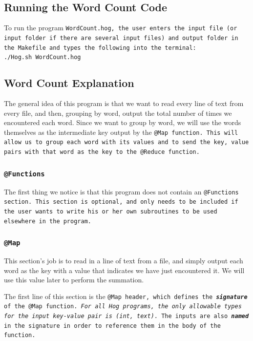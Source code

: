 \documentclass{report}
\begin{document}
\subsection{Running the Word Count Code} %
\label{sub:running_the_word_count_code}

To run the program \tt WordCount.hog\rm, the user enters the input file (or input folder if there are several input files) and output folder in the Makefile and types the following into the
terminal: \\

\noindent \tt ./Hog.sh WordCount.hog  \rm \\


\subsection{Word Count Explanation}

The general idea of this program is that we want to read every line of text from
every file, and then, grouping by word, output the total number of times we
encountered each word. Since we want to group by word, we will use the words
themselves as the intermediate key output by the \tt @Map \rm function. This will
allow us to group each word with its values and to send the key, value pairs with that word as the key to the \tt @Reduce \rm function.

\subsubsection{\tt @Functions \rm}

The first thing we notice is that this program does not contain an \tt @Functions
\rm section. This section is optional, and only needs to be included if the user
wants to write his or her own subroutines to be used elsewhere in the program.

\subsubsection{\tt @Map \rm}

This section's job is to read in a line of text from a file, and simply output each
word as the key with a value that indicates we have just encountered it. We will
use this value later to perform the summation.

The first line of this section is the \tt @Map \rm header, which defines the
\textbf{\emph{signature}} of the \tt @Map \rm function. \emph{For all
Hog programs, the only allowable types for the input key-value pair is \tt (int\rm,
\tt text)\rm}. The inputs are also \textbf{\emph{named}} in the signature in order
to reference them in the body of the function.
\end{document}
